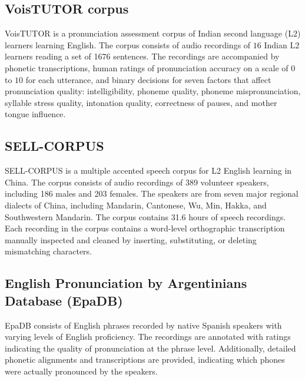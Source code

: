 
\subsection{VoisTUTOR corpus \cite{voistutor}}
VoisTUTOR is a pronunciation assessment corpus of Indian second language (L$2$) learners learning English.  The corpus consists of audio recordings of $16$ Indian L$2$ learners reading a set of 1676 sentences. The recordings are accompanied by phonetic transcriptions, human ratings of pronunciation accuracy on a scale of $0$ to $10$ for each utterance, and binary decisions for seven factors that affect pronunciation quality: intelligibility, phoneme quality, phoneme mispronunciation, syllable stress quality, intonation quality, correctness of pauses, and mother tongue influence. 

\subsection{SELL-CORPUS \cite{sell-corpus}}
SELL-CORPUS is a multiple accented speech corpus for L2 English learning in China. The corpus consists of audio recordings of 389 volunteer speakers, including 186 males and 203 females. The speakers are from seven major regional dialects of China, including Mandarin, Cantonese, Wu, Min, Hakka, and Southwestern Mandarin. The corpus contains 31.6 hours of speech recordings. Each recording in the corpus contains a word-level orthographic transcription manually inspected and cleaned by inserting, substituting, or deleting mismatching characters. 

\subsection{English Pronunciation by Argentinians Database (EpaDB) \cite{epadb}}
EpaDB consists of English phrases recorded by native Spanish speakers with varying levels of English proficiency. The recordings are annotated with ratings indicating the quality of pronunciation at the phrase level. Additionally, detailed phonetic alignments and transcriptions are provided, indicating which phones were actually pronounced by the speakers. 

